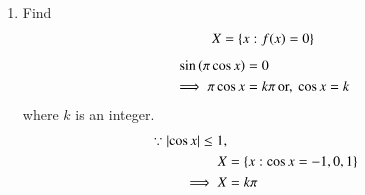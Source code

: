 \documentclass[journal,12pt,twocolumn]{IEEEtran}
\renewcommand\thesection{\arabic{section}}
\begin{document}
%

\begin{enumerate}[label=\thesection.\arabic*
,ref=\thesection.\theenumi]
\item Find
\begin{align}
X = \left\{x: f(x) = 0\right\}
\end{align}
\solution 
\begin{align}
\sin\left(\pi \cos x\right) &=0
\nonumber \\
\implies 
\pi \cos x &= k \pi \, \text{or, }\cos x = k
\end{align}
%
where $k$ is an integer.
\begin{align}
\because \left\vert\cos x\right\vert \le 1,
\nonumber \\
X &= \left\{x: \cos x = -1, 0, 1\right\}
\nonumber \\
\implies X &= k\pi
\end{align}


\end{enumerate}
\end{document}
